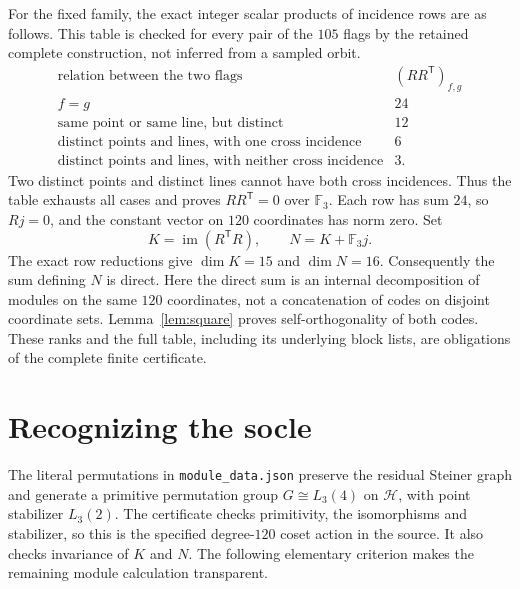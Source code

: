 \documentclass[11pt,a4paper]{article}
\newcommand{\im}{\operatorname{im}}
\begin{document}
For the fixed family, the exact integer scalar products of incidence rows
are as follows. This table is checked for every pair of the $105$ flags by
the retained complete construction, not inferred from a sampled orbit.
\[
\begin{array}{l|r}
\text{relation between the two flags}&(RR^{\mathsf T})_{f,g}\\ \hline
f=g&24\\
\text{same point or same line, but distinct}&12\\
\text{distinct points and lines, with one cross incidence}&6\\
\text{distinct points and lines, with neither cross incidence}&3.
\end{array}
\]
Two distinct points and distinct lines cannot have both cross incidences.
Thus the table exhausts all cases and proves $RR^{\mathsf T}=0$ over
$\mathbb F_3$. Each row has sum $24$, so $Rj=0$, and the constant vector on
$120$ coordinates has norm zero. Set
\[
 K=\im(R^{\mathsf T}R),\qquad N=K+\mathbb F_3j.
\]
The exact row reductions give $\dim K=15$ and $\dim N=16$.
Consequently the sum defining $N$ is direct. Here the direct sum is an
internal decomposition of modules on the same $120$ coordinates, not a
concatenation of codes on disjoint coordinate sets. Lemma~\ref{lem:square} proves
self-orthogonality of both codes. These ranks and the full table, including
its underlying block lists, are obligations of the complete finite certificate.

\section{Recognizing the socle}
The literal permutations in \texttt{module\_data.json} preserve the residual Steiner graph and generate a primitive
permutation group $G\cong L_3(4)$ on $\mathcal H$, with point stabilizer
$L_3(2)$. The certificate checks primitivity, the isomorphisms and stabilizer, so this is
the specified degree-$120$ coset action in the source. It also checks
invariance of $K$ and $N$. The following elementary criterion makes the
remaining module calculation transparent.
\end{document}

